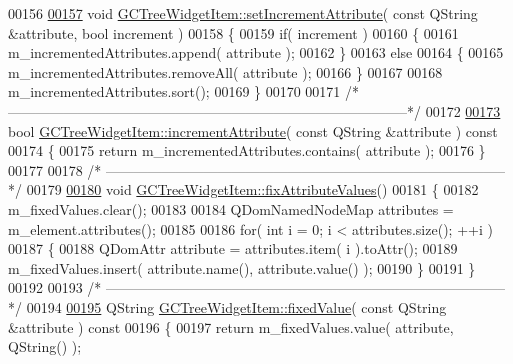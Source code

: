 \begin{DoxyCode}
00156 
\hypertarget{gctreewidgetitem_8cpp_source_l00157}{}\hyperlink{class_g_c_tree_widget_item_abf57de97998e38563dc9020cdf4d8340}{00157} \textcolor{keywordtype}{void} \hyperlink{class_g_c_tree_widget_item_abf57de97998e38563dc9020cdf4d8340}{GCTreeWidgetItem::setIncrementAttribute}( \textcolor{keyword}{const} QString &attribute, \textcolor{keywordtype}{bool} 
      increment )
00158 \{
00159   \textcolor{keywordflow}{if}( increment )
00160   \{
00161     m\_incrementedAttributes.append( attribute );
00162   \}
00163   \textcolor{keywordflow}{else}
00164   \{
00165     m\_incrementedAttributes.removeAll( attribute );
00166   \}
00167 
00168   m\_incrementedAttributes.sort();
00169 \}
00170 
00171 \textcolor{comment}{/*
      --------------------------------------------------------------------------------------*/}
00172 
\hypertarget{gctreewidgetitem_8cpp_source_l00173}{}\hyperlink{class_g_c_tree_widget_item_af0b5f0f5449f402c90e5ab7ff74acc77}{00173} \textcolor{keywordtype}{bool} \hyperlink{class_g_c_tree_widget_item_af0b5f0f5449f402c90e5ab7ff74acc77}{GCTreeWidgetItem::incrementAttribute}( \textcolor{keyword}{const} QString &attribute )\textcolor{keyword}{ const}
00174 \textcolor{keyword}{}\{
00175   \textcolor{keywordflow}{return} m\_incrementedAttributes.contains( attribute );
00176 \}
00177 
00178 \textcolor{comment}{/*
      --------------------------------------------------------------------------------------*/}
00179 
\hypertarget{gctreewidgetitem_8cpp_source_l00180}{}\hyperlink{class_g_c_tree_widget_item_ada99ae07bebffd9714be294cdd3d920b}{00180} \textcolor{keywordtype}{void} \hyperlink{class_g_c_tree_widget_item_ada99ae07bebffd9714be294cdd3d920b}{GCTreeWidgetItem::fixAttributeValues}()
00181 \{
00182   m\_fixedValues.clear();
00183 
00184   QDomNamedNodeMap attributes = m\_element.attributes();
00185 
00186   \textcolor{keywordflow}{for}( \textcolor{keywordtype}{int} i = 0; i < attributes.size(); ++i )
00187   \{
00188     QDomAttr attribute = attributes.item( i ).toAttr();
00189     m\_fixedValues.insert( attribute.name(), attribute.value() );
00190   \}
00191 \}
00192 
00193 \textcolor{comment}{/*
      --------------------------------------------------------------------------------------*/}
00194 
\hypertarget{gctreewidgetitem_8cpp_source_l00195}{}\hyperlink{class_g_c_tree_widget_item_a62a31fad1e50915f6df144e23394abef}{00195} QString \hyperlink{class_g_c_tree_widget_item_a62a31fad1e50915f6df144e23394abef}{GCTreeWidgetItem::fixedValue}( \textcolor{keyword}{const} QString &attribute )\textcolor{keyword}{ const}
00196 \textcolor{keyword}{}\{
00197   \textcolor{keywordflow}{return} m\_fixedValues.value( attribute, QString() );

\end{DoxyCode}
